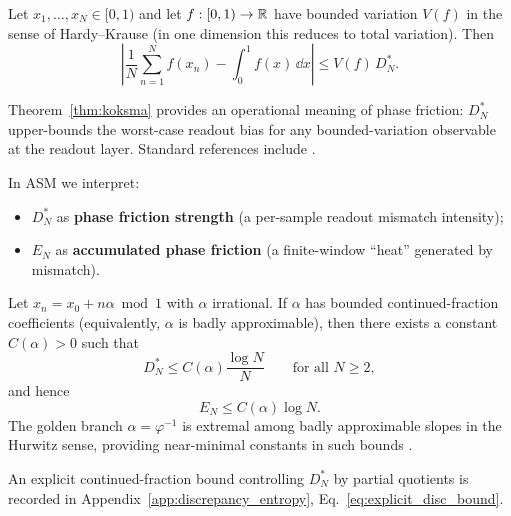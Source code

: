 \begin{theorem}
\label{thm:koksma}
Let $x_1,\dots,x_N\in[0,1)$ and let $f:[0,1)\to\mathbb{R}$ have bounded variation $V(f)$ in the sense of Hardy--Krause (in one dimension this reduces to total variation). Then
\begin{equation}
  \left|\frac{1}{N}\sum_{n=1}^N f(x_n) - \int_0^1 f(x)\,\dd x\right|
  \le V(f)\,D_N^\ast.
\end{equation}
\end{theorem}
\noindent Theorem~\ref{thm:koksma} provides an operational meaning of phase friction: $D_N^\ast$ upper-bounds the worst-case readout bias for any bounded-variation observable at the readout layer. Standard references include \cite{Koksma1935,KuipersNiederreiter1974}.

\noindent In ASM we interpret:
\begin{itemize}
  \item $D_N^\ast$ as \textbf{phase friction strength} (a per-sample readout mismatch intensity);
  \item $E_N$ as \textbf{accumulated phase friction} (a finite-window ``heat'' generated by mismatch).
\end{itemize}

\begin{theorem}
\label{thm:log_bound}
Let $x_n = x_0 + n\alpha \bmod 1$ with $\alpha$ irrational. If $\alpha$ has bounded continued-fraction coefficients (equivalently, $\alpha$ is badly approximable), then there exists a constant $C(\alpha)>0$ such that
\begin{equation}
D_N^\ast \le C(\alpha)\frac{\log N}{N}\qquad\text{for all } N\ge 2,
\end{equation}
and hence
\begin{equation}
E_N \le C(\alpha)\log N.
\end{equation}
The golden branch $\alpha=\varphi^{-1}$ is extremal among badly approximable slopes in the Hurwitz sense, providing near-minimal constants in such bounds \cite{Cassels1957,KuipersNiederreiter1974}.
\end{theorem}
\noindent An explicit continued-fraction bound controlling $D_N^\ast$ by partial quotients is recorded in Appendix~\ref{app:discrepancy_entropy}, Eq.~\eqref{eq:explicit_disc_bound}.

